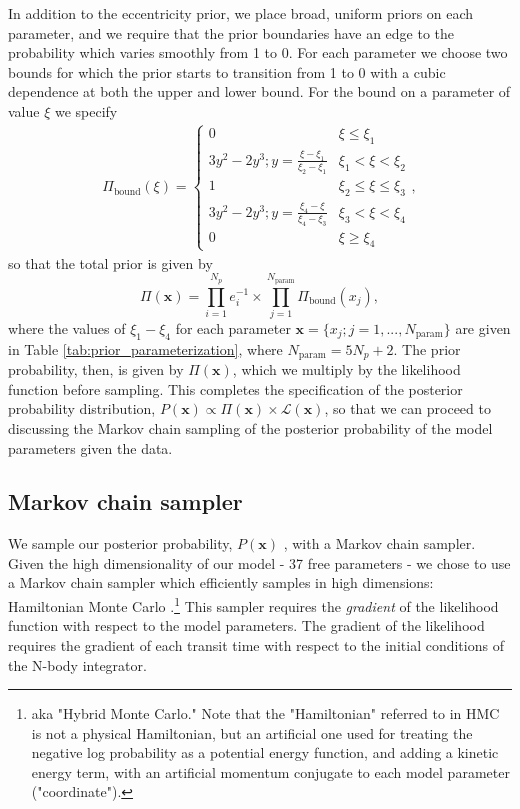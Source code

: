 \documentclass[fleqn,usenatbib]{mnras} %
\begin{document}
In addition to the eccentricity prior, we place broad, uniform priors on each parameter, and we require that
the prior boundaries have an edge to the probability which varies smoothly from 1 to 0.  For each parameter 
we choose two bounds for which the prior starts to transition from 1 to 0 with a cubic dependence at both
the upper and lower bound.  For the  bound on a parameter of value $\xi$ we specify
\begin{eqnarray}
\Pi_\mathrm{bound}(\xi) = 
\begin{cases}
0 &  \xi {\le} \xi_1\\
3y^2-2y^3; y = \frac{\xi-\xi_1}{\xi_2-\xi_1} & \xi_1 {<} \xi {<} \xi_2\\
1 & \xi_2 {\le} \xi {\le} \xi_3 \\
3y^2-2y^3; y = \frac{\xi_4-\xi}{\xi_4-\xi_3} & \xi_3{<} \xi {<} \xi_4\\
0 &  \xi {\ge} \xi_4
\end{cases},
\end{eqnarray}
so that the total prior is given by
\begin{equation}
    \Pi(\mathbf{x}) = \prod_{i=1}^{N_p} e_i^{-1} {\times} \prod_{j=1}^{N_\mathrm{param}} \Pi_\mathrm{bound}(x_j),
\end{equation}
where the values of $\xi_1{-}\xi_4$ for each parameter
$\mathbf{x} {=} \{x_j; j{=} 1,...,N_\mathrm{param}\}$ are given in Table
\ref{tab:prior_parameterization}, where $N_\mathrm{param} = 5 N_p + 2$.
The prior probability, then, is given by $\Pi(\mathbf{x})$, which we
multiply by the likelihood function before sampling.
This completes the specification of the posterior probability distribution, $P(\mathbf{x}) \propto \Pi(\mathbf{x}) \times \mathcal{L}(\mathbf{x})$,
so that we can proceed to discussing the Markov chain sampling of the posterior probability of the model parameters given the data.

\subsection{Markov chain sampler}

We sample our posterior probability, $P(\mathbf{x})$ ,
with a Markov chain sampler.
Given the high dimensionality of our model - 37 free parameters - we chose to use
a Markov chain sampler which efficiently samples in high dimensions:  Hamiltonian
Monte Carlo \citep[HMC; ][]{Duane1987,Neal2011,Betancourt2017,Monnahan2016}.\footnote{aka "Hybrid Monte Carlo." Note
that the "Hamiltonian" referred to in HMC is not a physical Hamiltonian, but an
artificial one used for treating the negative log probability as a potential
energy function, and adding a kinetic energy term, with an artificial momentum conjugate
to each model parameter ("coordinate").}  This
sampler requires the {\it gradient} of the likelihood function with respect to
the model parameters.  The gradient of the likelihood requires the gradient
of each transit time with respect to the initial conditions of the N-body
integrator.
\end{document}
